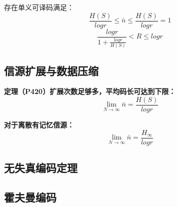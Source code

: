 \documentclass[UTF8]{ctexart} %
\begin{document}
				存在单义可译码满足：
				\[\frac{H(S)}{logr}\leq\bar{n}\leq\frac{H(S)}{logr}=1\]
				\[\frac{logr}{1+\frac{logr}{H(S)}}<R\leq logr\]
			\subsection{信源扩展与数据压缩}
				\textbf{定理（P420）扩展次数足够多，平均码长可达到下限：}
				\[\lim_{N\rightarrow\infty}\bar{n}=\frac{H(S)}{logr}\]
				
				\textbf{对于离散有记忆信源：}
				\[\lim_{N\rightarrow\infty}\bar{n}=\frac{H_\infty}{logr}\]
			\subsection{无失真编码定理}
			\subsection{霍夫曼编码}
				
				
		
\end{document}
